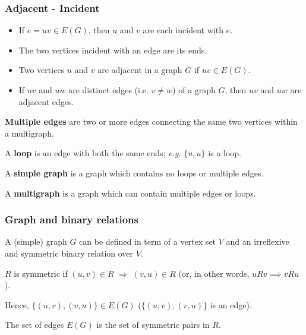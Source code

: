 \documentclass[aspectratio=169]{beamer}
\begin{document}
\begin{frame}\frametitle{Adjacent - Incident}
	\begin{definition}[Incident]
	\begin{itemize}
	\item If $e=uv\in E(G)$, then $u$ and $v$ are each incident with $e$.
	\item The two vertices incident with an edge are its ends.
	\end{itemize}
	\end{definition}
	\begin{definition}[Adjacent]
	\begin{itemize}
	\item Two vertices $u$ and $v$ are adjacent in a graph $G$ if $uv\in E(G)$. 
	\item If $uv$ and $uw$ are distinct edges (i.e. $v\not=w$) of a graph $G$, then $uv$ and $uw$ are adjacent edges.
	\end{itemize}
	\end{definition}
\end{frame}


\begin{frame}
	\begin{definition}
	{\bf Multiple edges} are two or more edges connecting the same two vertices within a multigraph.
	\end{definition}
	\begin{definition}[Loop]
	A {\bf loop} is an edge with both the same ends; \emph{e.g.} $\{u,u\}$ is a loop.
	\end{definition}
	\begin{definition}
		A {\bf simple graph} is a graph which contains no loops or multiple edges. 
	\end{definition}
	\begin{definition}[Multigraph]
		A {\bf multigraph} is a graph which can contain multiple edges or loops.
	\end{definition}
\end{frame}


\begin{frame}\frametitle{Graph and binary relations}
	A (simple) graph $G$ can be defined in term of a vertex set $V$ and an irreflexive and symmetric binary relation over $V$.
	
	$R$ is symmetric if $(u,v)\in R$ $\Rightarrow$ $(v,u)\in R$  (or, in other words, $uRv\implies vRu$).
	
	Hence, $\{(u,v),(v,u)\}\in E(G)$ ($\{(u,v),(v,u)\}$ is an edge).

	The set of edges $E(G)$ is the set of symmetric pairs in $R$.
\end{frame}
\end{document}
